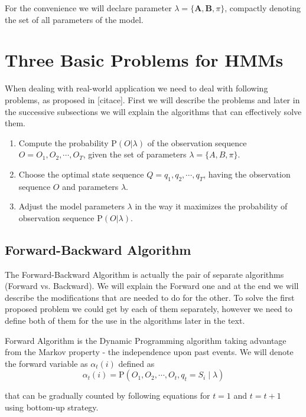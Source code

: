 \documentclass[thesis=M,english]{FITthesis}[2012/10/20]
\newcommand{\matr}[1]{\mathbf{#1}}
\begin{document}
For the convenience we will declare parameter $\lambda = \{\matr{A},\matr{B},\pi\}$, compactly denoting the set of all parameters of the model.   

\section{Three Basic Problems for HMMs}
When dealing with real-world application we need to deal with following problems, as proposed in [citace]. First we will describe the problems and later in the successive subsections we will explain the algorithms that can effectively solve them. 

\begin{enumerate}
\item Compute the probability $ \mathrm{P}(O|\lambda) $ of the observation sequence $O = O_1,O_2,\cdots,O_T$, given the set of parameters $\lambda = \{A,B,\pi\}$. 
\item Choose the optimal state sequence $Q = q_1,q_2,\cdots,q_T$, having the observation sequence $O$ and parameters $\lambda$.
\item Adjust the model parameters $\lambda$ in the way it maximizes the probability of observation sequence $ \mathrm{P}(O|\lambda) $. 
\end{enumerate}


\subsection{Forward-Backward Algorithm}
The Forward-Backward Algorithm is actually the pair of separate algorithms (Forward vs. Backward). We will explain the Forward one and at the end we will describe the modifications that are needed to do for the other. To solve the first proposed problem we could get by each of them separately, however we need to define both of them for the use in the algorithms later in the text.  

Forward Algorithm is the Dynamic Programming algorithm taking advantage from the Markov property - the independence upon past events. We will denote the forward variable as $\alpha_t(i)$ defined as
\begin{equation}
\alpha_t(i) = \mathrm{P}(O_1,O_2,\cdots,O_t,q_t = S_i \mid \lambda )
\end{equation}

that can be gradually counted by following equations for $t=1$ and $t=t+1$ using bottom-up strategy.
\end{document}

